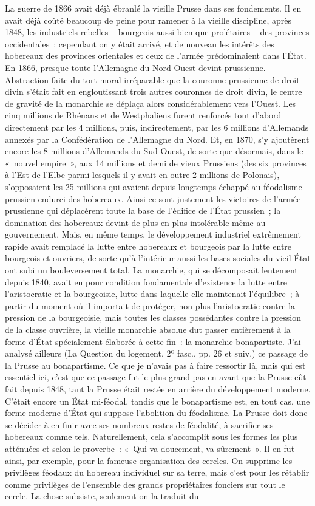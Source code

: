 \documentclass[french,twoside]{book} %
\begin{document}
La guerre de 1866 avait déjà ébranlé la vieille Prusse dans ses fondements. Il en avait déjà coûté beaucoup de peine pour ramener à la vieille discipline, après 1848, les industriels rebelles – bourgeois aussi bien que prolétaires – des provinces occidentales ; cependant on y était arrivé, et de nouveau les intérêts des hobereaux des provinces orientales et ceux de l’armée prédominaient dans l’État. En 1866, presque toute l’Allemagne du Nord-Ouest devint prussienne. Abstraction faite du tort moral irréparable que la couronne prussienne de droit divin s’était fait en engloutissant trois autres couronnes de droit divin, le centre de gravité de la monarchie se déplaça alors considérablement vers l’Ouest. Les cinq millions de Rhénans et de Westphaliens furent renforcés tout d’abord directement par les 4 millions, puis, indirectement, par les 6 millions d’Allemands annexés par la Confédération de l’Allemagne du Nord. Et, en 1870, s’y ajoutèrent encore les 8 millions d’Allemands du Sud-Ouest, de sorte que désormais, dans le « nouvel empire », aux 14 millions et demi de vieux Prussiens (des six provinces à l’Est de l’Elbe parmi lesquels il y avait en outre 2 millions de Polonais), s’opposaient les 25 millions qui avaient depuis longtemps échappé au féodalisme prussien endurci des hobereaux. Ainsi ce sont justement les victoires de l’armée prussienne qui déplacèrent toute la base de l’édifice de l’État prussien ; la domination des hobereaux devint de plus en plus intolérable même au gouvernement. Mais, en même temps, le développement industriel extrêmement rapide avait remplacé la lutte entre hobereaux et bourgeois par la lutte entre bourgeois et ouvriers, de sorte qu’à l’intérieur aussi les bases sociales du vieil État ont subi un bouleversement total. La monarchie, qui se décomposait lentement depuis 1840, avait eu pour condition fondamentale d’existence la lutte entre l’aristocratie et la bourgeoisie, lutte dans laquelle elle maintenait l’équilibre ; à partir du moment où il importait de protéger, non plus l’aristocratie contre la pression de la bourgeoisie, mais toutes les classes possédantes contre la pression de la classe ouvrière, la vieille monarchie absolue dut passer entièrement à la forme d’État spécialement élaborée à cette fin : la monarchie bonapartiste. J’ai analysé ailleurs (La Question du logement, 2º fasc., pp. 26 et suiv.) ce passage de la Prusse au bonapartisme. Ce que je n’avais pas à faire ressortir là, mais qui est essentiel ici, c’est que ce passage fut le plus grand pas en avant que la Prusse eût fait depuis 1848, tant la Prusse était restée en arrière du développement moderne. C’était encore un État mi-féodal, tandis que le bonapartisme est, en tout cas, une forme moderne d’État qui suppose l’abolition du féodalisme. La Prusse doit donc se décider à en finir avec ses nombreux restes de féodalité, à sacrifier ses hobereaux comme tels. Naturellement, cela s’accomplit sous les formes les plus atténuées et selon le proverbe : « Qui va doucement, va sûrement ». Il en fut ainsi, par exemple, pour la fameuse organisation des cercles. On supprime les privilèges féodaux du hobereau individuel sur sa terre, mais c’est pour les rétablir comme privilèges de l’ensemble des grands propriétaires fonciers sur tout le cercle. La chose subsiste, seulement on la traduit du 
\end{document}
